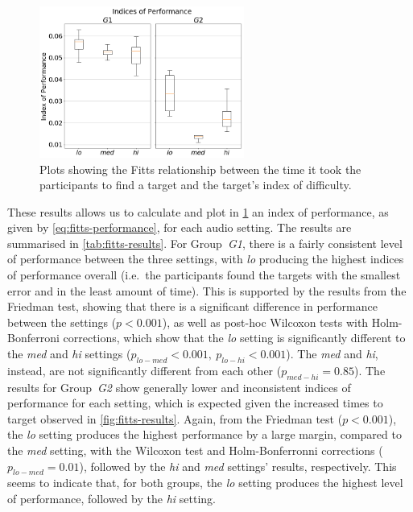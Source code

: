 \documentclass[acmsmall]{acmart}
\begin{document}
\begin{figure}
  \centering
  \includegraphics[width=0.6\textwidth]{figures/fitts_ips.png}
  \caption{Plots showing the Fitts relationship between the time it took the participants to find a target and the target's index of difficulty. }\label{fig:fitts-ips}
\end{figure}

These results allows us to calculate and plot in \cref{fig:fitts-ips} an index of performance, as given by \cref{eq:fitts-performance}, for each audio setting.
The results are summarised in \cref{tab:fitts-results}.
For Group~\textit{G1}, there is a fairly consistent level of performance between the three settings, with \textit{lo} producing the highest indices of performance overall (i.e.\ the participants found the targets with the smallest error and in the least amount of time).
This is supported by the results from the Friedman test, showing that there is a significant difference in performance between the settings ($p < 0.001$), as well as post-hoc Wilcoxon tests with Holm-Bonferroni corrections, which show that the \textit{lo} setting is significantly different to the \textit{med} and \textit{hi} settings ($p_{lo-med} < 0.001,~p_{lo-hi} < 0.001$). The \textit{med} and \textit{hi}, instead, are not significantly different from each other ($p_{med-hi} = 0.85$).
The results for Group~\textit{G2} show generally lower and inconsistent indices of performance for each setting, which is expected given the increased times to target observed in \cref{fig:fitts-results}.
Again, from the Friedman test ($p < 0.001$), the \textit{lo} setting produces the highest performance by a large margin, compared to the \textit{med} setting, with the Wilcoxon test and Holm-Bonferronni corrections ($p_{lo-med}=0.01$), followed by the \textit{hi} and \textit{med} settings' results, respectively.
This seems to indicate that, for both groups, the \textit{lo} setting produces the highest level of performance, followed by the \textit{hi} setting.
\end{document}
